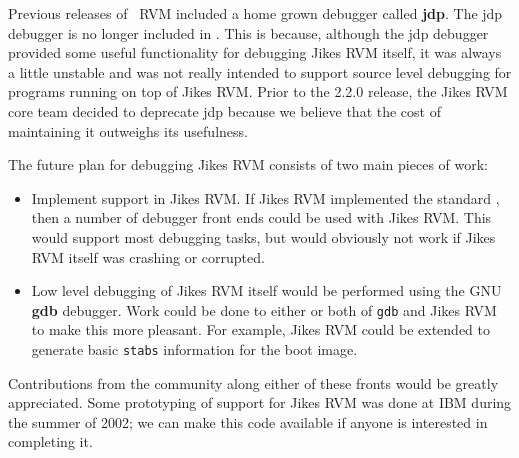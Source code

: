 Previous releases of \JikesTM\ RVM included a home grown
debugger called {\bf jdp}.  The jdp debugger is no longer included in
\jrvm{}.  This is because, although the jdp debugger provided some
useful functionality for debugging Jikes RVM itself, it was always a
little unstable and was not really intended to support source level
debugging for programs running on top of Jikes RVM.  Prior to the
2.2.0 release, the Jikes RVM core team decided to deprecate jdp
because we believe that the cost of maintaining it outweighs its
usefulness.


The future plan for debugging Jikes RVM consists of two main pieces of
work:

\label{JDWP}
\begin{itemize}
\item Implement  support in Jikes RVM. If Jikes RVM
implemented the standard , then a 
number of debugger front ends could be used with Jikes RVM.  This
would support most debugging tasks, but would obviously not work if
Jikes RVM itself was crashing or corrupted.

\item Low level debugging of Jikes RVM itself would be performed using
the GNU {\bf gdb} debugger.  Work could be done to either or both of
{\tt gdb} and Jikes RVM to make this more pleasant.  For example,
Jikes RVM could be extended to generate basic {\tt stabs} information
for the boot image.
\end{itemize}

Contributions from the community along either of these fronts would be
greatly appreciated.  Some prototyping of  support for Jikes RVM
was done at IBM during the summer of 2002; we can make this code
available if anyone is interested in completing it.


